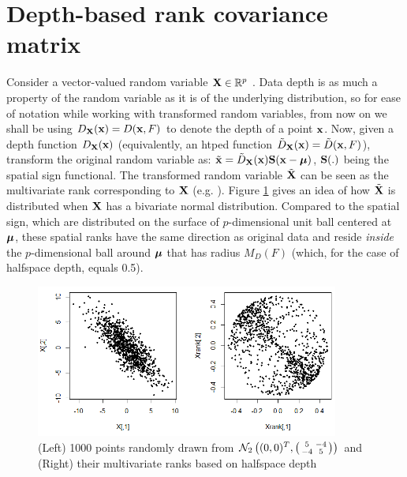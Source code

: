\documentclass[fleqn,11pt]{article}
\begin{document}
\section{Depth-based rank covariance matrix} \label{section:dcmSection}

Consider a vector-valued random variable ${\mathbf{X}} \in \mathbb{R}^p$ . Data depth is as much a property of the random variable as it is of the underlying distribution, so for ease of notation while working with transformed random variables, from now on we shall be using $D_{\mathbf{X}}({\bf{x}}) = D({\bf{x}}, F)$ to denote the depth of a point ${\bf{x}}$. Now, given a depth function $D_{{\mathbf{X}}}({\bf{x}})$ (equivalently, an htped function $\tilde D_{\mathbf{X}}({\bf{x}}) = \tilde D({\bf{x}}, F)$), transform the original random variable as: $\tilde {{\bf{x}}} = \tilde D_{\mathbf{X}}({\bf{x}}) {\mathbf{S}}({\bf{x}} - {\boldsymbol{\mu}})$, ${\mathbf{S}}(.)$ being the spatial sign functional. The transformed random variable $\tilde {{\mathbf{X}}}$ can be seen as the multivariate rank corresponding to ${\mathbf{X}}$ (e.g. \cite{serfling2006}). Figure \ref{fig:rankplot} gives an idea of how $\tilde {{\mathbf{X}}}$ is distributed when ${\mathbf{X}}$ has a bivariate normal distribution. Compared to the spatial sign, which are distributed on the surface of $p$-dimensional unit ball centered at ${\boldsymbol{\mu}}$, these spatial ranks have the same direction as original data and reside \textit{inside} the $p$-dimensional ball around ${\boldsymbol{\mu}}$ that has radius $M_D(F)$ (which, for the case of halfspace depth, equals 0.5).

\begin{figure}[t]
	\captionsetup{singlelinecheck=off}
	\centering
		\includegraphics[height=5cm]{../Codes/rankplot.png}
	\caption{(Left) 1000 points randomly drawn from $\mathcal N_2\left((0,0)^T, \left(\protect\begin{smallmatrix} 5 & -4 \\ -4 & 5 \protect\end{smallmatrix}\right)\right) $ and (Right) their multivariate ranks based on halfspace depth}
	\label{fig:rankplot}
\end{figure}
\end{document}
